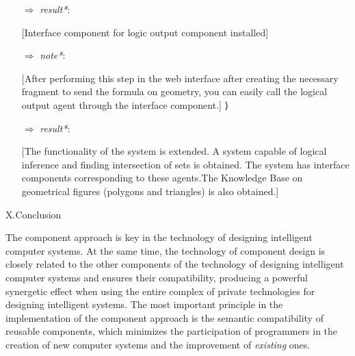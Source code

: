 \documentclass[10pt, a4paper]{article}
\begin{document}
\begin{multicols}{2}
\begin{flushleft}
\begin{itemize}
[ScComponentManagerInstallAgent]
\vspace{-0.2cm}\item [ $\Rightarrow$]\textit{result*}:


[Interface component for logic output component installed]
\vspace{-0.2cm}\item [ $\Rightarrow$]\textit{note*}:


[After performing this step in the web interface after creating the necessary fragment to send the formula on geometry, you can easily call the logical output agent through the interface component.]
⟩

\vspace{-0.2cm}\item [ $\Rightarrow$]\textit{result*}:


[The functionality of the system is extended. A system capable of logical inference and finding intersection of sets is obtained. The system has interface components corresponding to these agents.The Knowledge Base on geometrical figures (polygons and triangles) is also obtained.]
\end{itemize}
\begin{center}
X.Conclusion
\end{center}
\justify
\setlength{\columnsep}{0cm}
\quad The component approach is key in the technology of designing intelligent computer systems. At the same time, the technology of component design is closely related to the other components of the technology of designing intelligent computer systems and ensures their compatibility, producing a powerful synergetic effect when using the entire complex of private technologies for designing intelligent systems. The most important principle in the implementation of the component approach is the semantic compatibility of reusable components, which minimizes the participation of programmers in the creation of new computer systems and the improvement of \textit{existing} ones.
\end{flushleft}
\end{multicols}
\newpage
{} %
\setlength{\columnsep}{0.5cm}
\end{document}

